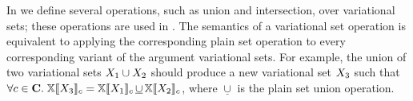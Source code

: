 In  we define several operations, such as union and
intersection, over variational sets; these operations are used in . The
semantics of a variational set operation is equivalent to applying the corresponding
plain set operation to every corresponding variant of the argument variational sets. For
example, the union of two variational sets $\vset_1\cup\vset_2$ should produce a new
variational set $\vset_3$ such that
%
$\forall c\in\confSet.\;
\osetSem{\vset_3} = \osetSem{\vset_1}\,\underline{\cup}\,\osetSem{\vset_2}$,
where $\underline{\cup}$ is the plain set union operation.
%
%

 


